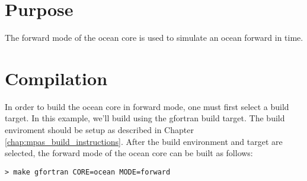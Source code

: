 \section{Purpose}
\label{sec:forward_purpose}

The forward mode of the ocean core is used to simulate an ocean forward in time. 

\section{Compilation}
\label{sec:forward_compilation}

In order to build the ocean core in forward mode, one must first select a build
target. In this example, we'll build using the gfortran build target. The build
enviroment should be setup as described in Chapter
\ref{chap:mpas_build_instructions}. After the build environment and target are
selected, the forward mode of the ocean core can be built as follows:

\vspace{12pt}
{\tt > make gfortran CORE=ocean MODE=forward}

